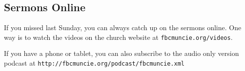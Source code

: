\vspace{\fill}

\subsection{Sermons Online}
\label{timeofresponse}

If you missed last Sunday, you can always catch up on the sermons online. One way is to watch the videos on the church website at \texttt{fbcmuncie.org/videos}.

If you have a phone or tablet, you can also subscribe to the audio only version podcast at \texttt{http://fbcmuncie.org/podcast/fbcmuncie.xml}

\vspace{\fill}
